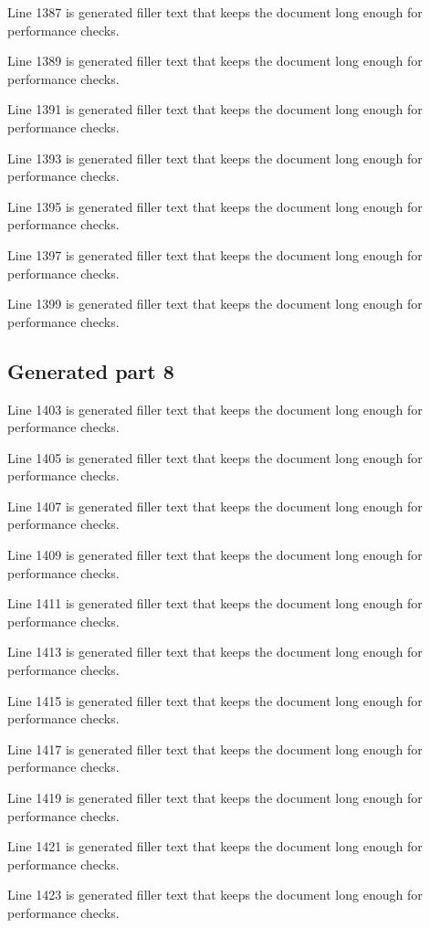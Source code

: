 Line 1387 is generated filler text that keeps the document long enough for performance checks.

Line 1389 is generated filler text that keeps the document long enough for performance checks.

Line 1391 is generated filler text that keeps the document long enough for performance checks.

Line 1393 is generated filler text that keeps the document long enough for performance checks.

Line 1395 is generated filler text that keeps the document long enough for performance checks.

Line 1397 is generated filler text that keeps the document long enough for performance checks.

Line 1399 is generated filler text that keeps the document long enough for performance checks.

\subsection{Generated part 8}

Line 1403 is generated filler text that keeps the document long enough for performance checks.

Line 1405 is generated filler text that keeps the document long enough for performance checks.

Line 1407 is generated filler text that keeps the document long enough for performance checks.

Line 1409 is generated filler text that keeps the document long enough for performance checks.

Line 1411 is generated filler text that keeps the document long enough for performance checks.

Line 1413 is generated filler text that keeps the document long enough for performance checks.

Line 1415 is generated filler text that keeps the document long enough for performance checks.

Line 1417 is generated filler text that keeps the document long enough for performance checks.

Line 1419 is generated filler text that keeps the document long enough for performance checks.

Line 1421 is generated filler text that keeps the document long enough for performance checks.

Line 1423 is generated filler text that keeps the document long enough for performance checks.

